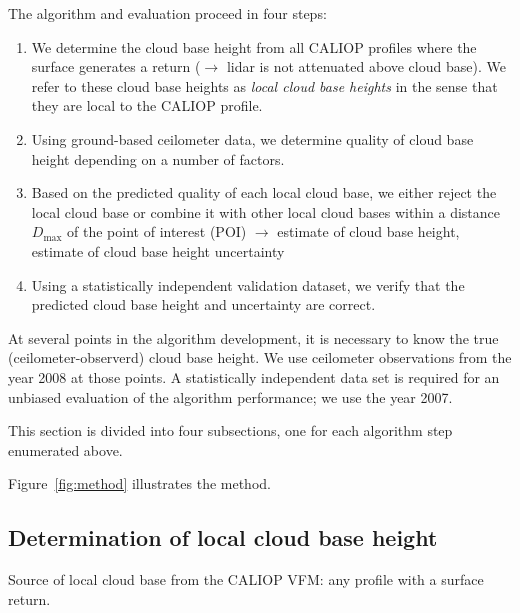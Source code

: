 \documentclass[amt,manuscript]{copernicus}\usepackage[]{graphicx}\usepackage[]{color}
\begin{document}
The algorithm and evaluation proceed in four steps:
\begin{enumerate}
\item We determine the cloud base height from all CALIOP profiles where the
  surface generates a return ($\longrightarrow$ lidar is not attenuated above
  cloud base).  We refer to these cloud base heights as \textit{local cloud base
    heights} in the sense that they are local to the CALIOP profile.
\item Using ground-based ceilometer data, we determine quality of cloud base
  height depending on a number of factors.  
\item Based on the predicted quality of each local cloud base, we either reject
  the local cloud base or combine it with other local cloud bases within a
  distance $D_\text{max}$ of the point of interest (POI) $\longrightarrow$
  estimate of cloud base height, estimate of cloud base height uncertainty
\item Using a statistically independent validation dataset, we verify that the
  predicted cloud base height and uncertainty are correct.
\end{enumerate}

At several points in the algorithm development, it is necessary to know the true
(ceilometer-observerd) cloud base height.  We use ceilometer observations from
the year 2008 at those points.  A statistically independent data set is required
for an unbiased evaluation of the algorithm performance; we use the year 2007.

This section is divided into four subsections, one for each algorithm step
enumerated above.

Figure~\ref{fig:method} illustrates the method.

\subsection{Determination of local cloud base height}
\label{sec:algorithm:local}
Source of local cloud base from the CALIOP VFM: any profile with a surface
return.  
\end{document}
